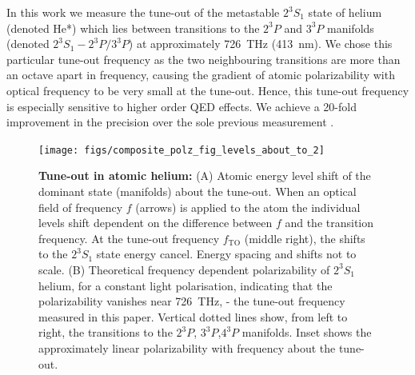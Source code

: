 \documentclass[12pt]{article}
\newcommand{\MetastableState}{2^{3\!}S_1}%
\newcommand{\UpperStateManifold}{3^{3\!}P}%
\newcommand{\LowerStateManifold}{2^{3\!}P}%
\newcommand{\TO}{\MetastableState- \LowerStateManifold / \UpperStateManifold}%
\begin{document}
In this work we measure the tune-out of the metastable $\MetastableState$ state of helium (denoted He*) which lies between transitions to the $\LowerStateManifold$ and $\UpperStateManifold$ manifolds (denoted $\TO$) at approximately 726~THz (413~nm). We chose this particular tune-out frequency as the two neighbouring transitions are more than an octave apart in frequency, causing the gradient of atomic polarizability with optical frequency to be very small at the tune-out. Hence, this tune-out frequency is especially sensitive to higher order QED effects. We achieve a 20-fold improvement in the precision over the sole previous measurement \cite{PhysRevLett.115.043004}.
\begin{figure} 
\centering
\texttt{[image: figs/composite\_polz\_fig\_levels\_about\_to\_2]}
\caption{\textbf{Tune-out in atomic helium:}
(A) Atomic energy level shift of the dominant state (manifolds) about the tune-out.  When an optical field of frequency $f$ (arrows) is applied to the atom the individual
levels shift dependent on the difference between $f$ and the transition frequency. At the tune-out frequency $f_{\mathrm{TO}}$ (middle right), the shifts to the $\MetastableState$ state energy cancel.
Energy spacing and shifts not to scale.
(B) Theoretical frequency dependent polarizability of $\MetastableState$ helium, for a constant light polarisation, indicating that the polarizability vanishes near 726~THz, - the tune-out frequency measured in this paper. 
Vertical dotted lines show, from left to right, the transitions to the  $\LowerStateManifold$, $\UpperStateManifold$,$4^{3\!}P$ manifolds. Inset shows the approximately linear polarizability with frequency about the tune-out.
}
\label{fig:schematic} 
\end{figure}
\end{document}

